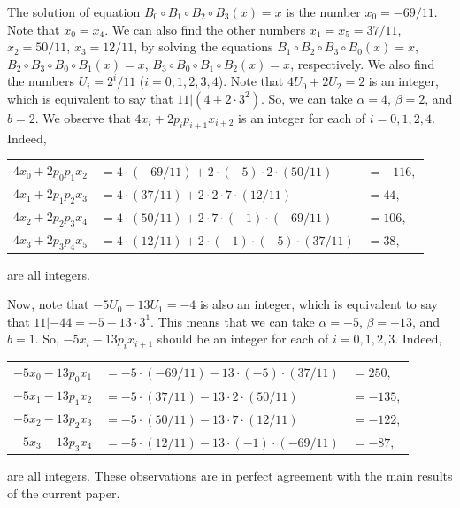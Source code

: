 \documentclass[12pt, twoside, leqno]{article}
\theoremstyle{definition}
\numberwithin{equation}{section}
\begin{document}
The solution of equation $B_0 \circ B_1 \circ B_2 \circ B_3 (x)=x$ is the number $x_0=-69/11$. Note that $x_0=x_4$. We can also find the other numbers $x_1=x_5=37/11$, $x_2=50/11$, $x_3=12/11$, by solving the equations $B_1 \circ B_2 \circ B_3 \circ B_0 (x)=x$, $B_2 \circ B_3 \circ B_0 \circ B_1 (x)=x$, $B_3 \circ B_0 \circ B_1 \circ B_2 (x)=x$, respectively. We also find the numbers $U_i=2^i/11$ ($i=0,1,2,3,4$). Note that $4U_0+2U_2=2$ is an integer, which is equivalent to say that $11|(4+2\cdot 3^2)$. So, we can take $\alpha=4$, $\beta=2$, and $b=2$. We observe that $4x_i+2p_i p_{i+1} x_{i+2}$
is an integer for each of $i=0,1,2,4$. Indeed,
\begin{center}
\begin{tabular}{lll}
$4x_0+2p_0 p_1 x_2$ & $=4\cdot (-69/11)+2\cdot (-5)\cdot 2\cdot (50/11)$ &$=-116,$\\
$4x_1+2p_1 p_2 x_3$ & $=4\cdot (37/11)+2\cdot 2\cdot 7\cdot (12/11)$ & $=44,$\\
$4x_2+2p_2 p_3 x_4$ & $=4\cdot (50/11)+2\cdot 7\cdot (-1)\cdot (-69/11)$ & $=106,$\\
$4x_3+2p_3 p_4 x_5$ & $=4\cdot (12/11)+2\cdot (-1)\cdot (-5)\cdot (37/11)$ & $=38,$\\
\end{tabular}
\end{center}
are all integers. 

Now, note that $-5U_0-13U_1=-4$ is also an integer, which is equivalent to say that $11|-44=-5-13\cdot 3^1$. This means that we can take $\alpha =-5$, $\beta=-13$, and $b=1$. So, $-5x_i-13p_i x_{i+1}$
should be an integer for each of $i=0,1,2,3$. Indeed,
\begin{center}
\begin{tabular}{lll}
$-5x_0-13p_0 x_1$ & $=-5\cdot (-69/11)-13\cdot (-5)\cdot (37/11)$ & $=250,$\\
$-5x_1-13p_1 x_2$ & $=-5\cdot (37/11)-13\cdot 2\cdot (50/11)$ & $=-135,$\\
$-5x_2-13p_2 x_3$ & $=-5\cdot (50/11)-13\cdot 7\cdot (12/11)$ & $=-122,$\\
$-5x_3-13p_3 x_4$ & $=-5\cdot (12/11)-13\cdot (-1)\cdot (-69/11)$ & $=-87,$\\
\end{tabular}
\end{center}
are all integers. These observations are in perfect agreement with the main results of the current paper.
\end{document}
